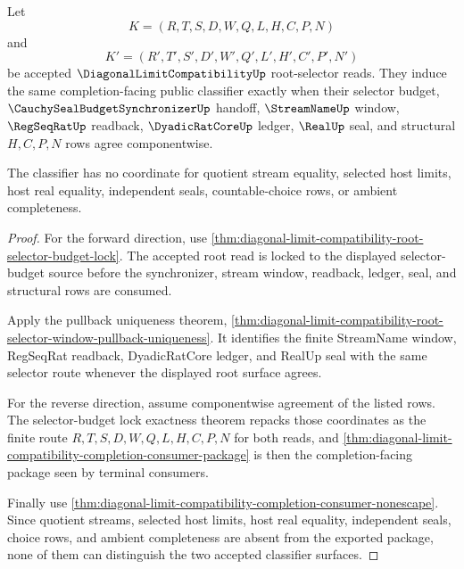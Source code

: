 \begin{theorem}
\label{thm:diagonal-limit-compatibility-selector-budget-classifier-pullback}
Let
$$
K=(R,T,S,D,W,Q,L,H,C,P,N)
$$
and
$$
K'=(R',T',S',D',W',Q',L',H',C',P',N')
$$
be accepted $\DiagonalLimitCompatibilityUp$ root-selector reads. They induce the same completion-facing public classifier exactly when their selector budget, $\CauchySealBudgetSynchronizerUp$ handoff, $\StreamNameUp$ window, $\RegSeqRatUp$ readback, $\DyadicRatCoreUp$ ledger, $\RealUp$ seal, and structural $H,C,P,N$ rows agree componentwise.

The classifier has no coordinate for quotient stream equality, selected host limits, host real equality, independent seals, countable-choice rows, or ambient completeness.
\end{theorem}
\begin{proof}
For the forward direction, use \autoref{thm:diagonal-limit-compatibility-root-selector-budget-lock}. The accepted root read is locked to the displayed selector-budget source before the synchronizer, stream window, readback, ledger, seal, and structural rows are consumed.

Apply the pullback uniqueness theorem, \autoref{thm:diagonal-limit-compatibility-root-selector-window-pullback-uniqueness}. It identifies the finite StreamName window, RegSeqRat readback, DyadicRatCore ledger, and RealUp seal with the same selector route whenever the displayed root surface agrees.

For the reverse direction, assume componentwise agreement of the listed rows. The selector-budget lock exactness theorem repacks those coordinates as the finite route $R,T,S,D,W,Q,L,H,C,P,N$ for both reads, and \autoref{thm:diagonal-limit-compatibility-completion-consumer-package} is then the completion-facing package seen by terminal consumers.

Finally use \autoref{thm:diagonal-limit-compatibility-completion-consumer-nonescape}. Since quotient streams, selected host limits, host real equality, independent seals, choice rows, and ambient completeness are absent from the exported package, none of them can distinguish the two accepted classifier surfaces.
\end{proof}

